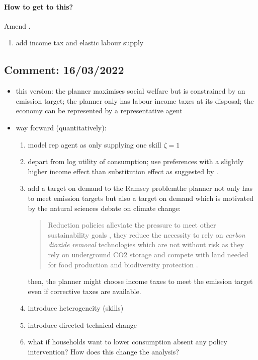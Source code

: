 \paragraph{How to get to this?}
\ar Amend \cite{Fried2018ClimateAnalysis}. 
\begin{enumerate}
\item add income tax and elastic labour supply
\end{enumerate}
\subsection*{Comment: 16/03/2022}
\begin{itemize}
	\item this version: the planner maximises social welfare but is constrained by an emission target; the planner only has labour income taxes at its disposal; the economy can be represented by a representative agent
	\item way forward (quantitatively):
	\begin{enumerate}
		\item model rep agent as only supplying one skill \ar $\zeta=1$
			\item depart from log utility of consumption; use preferences with a slightly higher income effect than substitution effect as suggested by \cite{Boppart2019LaborPerspectiveb}.
		\item  add a target on demand to the Ramsey problem\ar the planner not only has to meet emission targets but also a target on demand which is motivated by the natural sciences debate on climate change: 
		\begin{quote}Reduction policies alleviate the pressure to meet other sustainability goals \citep{Bertram2018TargetedScenarios}, they reduce the necessity to rely on \textit{carbon dioxide removal} technologies which are not without risk as they rely on  underground CO2 storage and compete with land needed for food production and biodiversity protection \citep{VanVuuren2018AlternativeTechnologies}.
		\end{quote}
	then, the planner might choose income taxes to meet the emission target even if corrective taxes are available.

		\item  introduce heterogeneity  (skills) 
		\item  introduce directed technical change 
		\item what if households want to lower consumption absent any policy intervention? How does this change the analysis?
	\end{enumerate}
	
\end{itemize}


